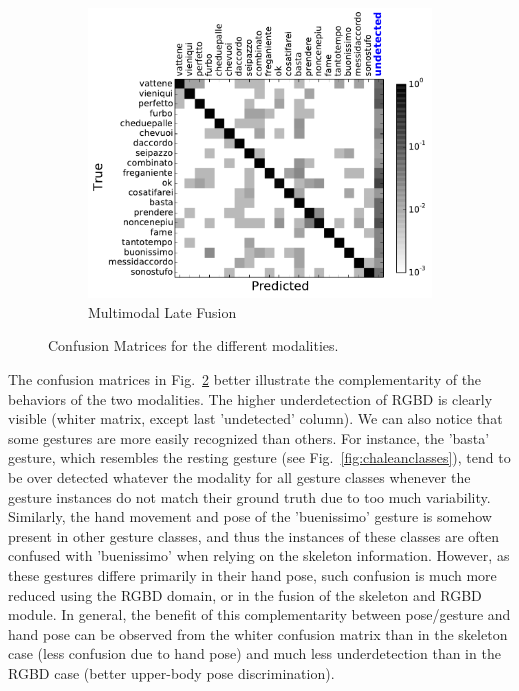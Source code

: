 \begin{figure}[t]
        ~ %
        \begin{subfigure}[c]{0.36\textwidth}
                \includegraphics[width=\textwidth]{images/cm/cm_combination}
\vspace*{-3mm}
                \caption{Multimodal Late Fusion}
                \label{fusion_cm}
        \end{subfigure}

  \caption{Confusion Matrices  for the different modalities.}
\label{fig:confusion_matrix}
\end{figure}

%
The confusion matrices in Fig.~\ref{fig:confusion_matrix} better illustrate the complementarity of the behaviors of the two modalities.
%
The higher underdetection of RGBD is clearly visible (whiter matrix, except last 'undetected' column).
%
We can also notice that some gestures are more easily recognized than others.
For instance, the 'basta' gesture, which resembles  the resting gesture (see Fig.~\ref{fig:chaleanclasses}), tend to be over detected whatever the modality 
for all gesture classes whenever the gesture instances 
do not match their ground truth due to too much variability.
%
Similarly, the hand movement and pose of the 'buenissimo' gesture is somehow present in other gesture classes, 
and thus the instances of these classes are often confused with 'buenissimo' when relying on the skeleton information.
%
However, as these gestures differe  primarily in their hand pose, such confusion is much more reduced using the RGBD domain, 
or in the fusion of the skeleton and RGBD module.
%
In general, the benefit of this complementarity between pose/gesture and hand pose
can be observed from the whiter confusion matrix than in the skeleton case (less confusion due to hand pose)  
and much less underdetection than in the RGBD case (better upper-body pose discrimination).
%


